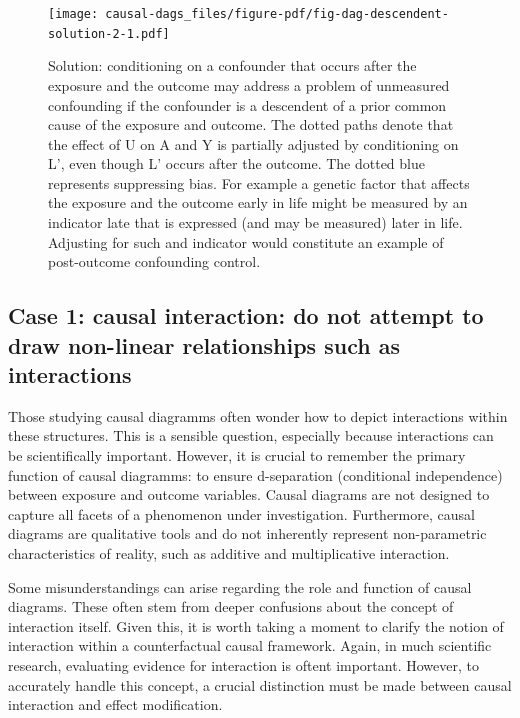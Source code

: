 \documentclass[
  singlecolumn]{report}
\begin{document}
\begin{figure}

{\centering \texttt{[image: causal-dags\_files/figure-pdf/fig-dag-descendent-solution-2-1.pdf]}

}

\caption{\label{fig-dag-descendent-solution-2}Solution: conditioning on
a confounder that occurs after the exposure and the outcome may address
a problem of unmeasured confounding if the confounder is a descendent of
a prior common cause of the exposure and outcome. The dotted paths
denote that the effect of U on A and Y is partially adjusted by
conditioning on L', even though L' occurs after the outcome. The dotted
blue represents suppressing bias. For example a genetic factor that
affects the exposure and the outcome early in life might be measured by
an indicator late that is expressed (and may be measured) later in life.
Adjusting for such and indicator would constitute an example of
post-outcome confounding control.}

\end{figure}

\hypertarget{case-1-causal-interaction-do-not-attempt-to-draw-non-linear-relationships-such-as-interactions}{%
\subsection{Case 1: causal interaction: do not attempt to draw
non-linear relationships such as
interactions}\label{case-1-causal-interaction-do-not-attempt-to-draw-non-linear-relationships-such-as-interactions}}

Those studying causal diagramms often wonder how to depict interactions
within these structures. This is a sensible question, especially because
interactions can be scientifically important. However, it is crucial to
remember the primary function of causal diagramms: to ensure
d-separation (conditional independence) between exposure and outcome
variables. Causal diagrams are not designed to capture all facets of a
phenomenon under investigation. Furthermore, causal diagrams are
qualitative tools and do not inherently represent non-parametric
characteristics of reality, such as additive and multiplicative
interaction.

Some misunderstandings can arise regarding the role and function of
causal diagrams. These often stem from deeper confusions about the
concept of interaction itself. Given this, it is worth taking a moment
to clarify the notion of interaction within a counterfactual causal
framework. Again, in much scientific research, evaluating evidence for
interaction is oftent important. However, to accurately handle this
concept, a crucial distinction must be made between causal interaction
and effect modification.
\end{document}
